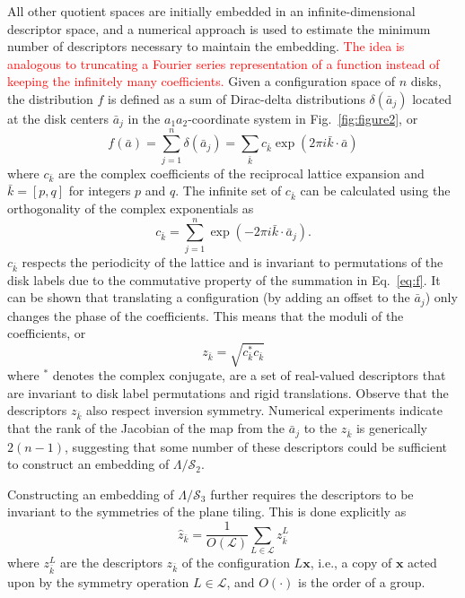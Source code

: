 \documentclass[default,iicol]{sn-jnl}%
\theoremstyle{thmstyleone}%
\theoremstyle{thmstyletwo}%
\theoremstyle{thmstylethree}%
\renewcommand{\vec}[1]{\bar{#1}}
\providecommand{\config}[1]{\mathbf{#1}}
\providecommand{\rmi}{i}
\providecommand{\red}[1]{\textcolor{red}{#1}}
\begin{document}
All other quotient spaces are initially embedded in an infinite-dimensional descriptor space, and a numerical approach is used to estimate the minimum number of descriptors necessary to maintain the embedding. \red{The idea is analogous to truncating a Fourier series representation of a function instead of keeping the infinitely many coefficients.} Given a configuration space of $n$ disks, the distribution $f$ is defined as a sum of Dirac-delta distributions $\delta(\vec{a}_j)$ located at the disk centers $\vec{a}_j$ in the $a_1a_2$-coordinate system in Fig.\ \ref{fig:figure2}, or
\begin{equation}
f(\vec{a}) = \sum_{j = 1}^{n} \delta(\vec{a}_j) = \sum_{\vec{k}} {c_{\vec{k}} \exp{(2\pi \rmi \vec{k} \cdot \vec{a})}}
\label{eq:f}
\end{equation}
where $c_{\vec{k}}$ are the complex coefficients of the reciprocal lattice expansion and $\vec{k} = [p, q]$ for integers $p$ and $q$. The infinite set of $c_{\vec{k}}$ can be calculated using the orthogonality of the complex exponentials as
\begin{equation}
c_{\vec{k}} = \sum_{j=1}^{n} \exp{(-2\pi \rmi \vec{k} \cdot \vec{a}_j)} .
\label{eq:c_k}
\end{equation}
$c_{\vec{k}}$ respects the periodicity of the lattice and is invariant to permutations of the disk labels due to the commutative property of the summation in Eq.\ \ref{eq:f}. It can be shown that translating a configuration (by adding an offset to the $\vec{a}_j$) only changes the phase of the coefficients. This means that the moduli of the coefficients, or
\begin{equation}
z_{\vec{k}} = \sqrt{c^\ast_{\vec{k}} c_{\vec{k}}}
\label{eq:z_k}
\end{equation}
where $^\ast$ denotes the complex conjugate, are a set of real-valued descriptors that are invariant to disk label permutations and rigid translations. Observe that the descriptors $z_{\vec{k}}$ also respect inversion symmetry. Numerical experiments indicate that the rank of the Jacobian of the map from the $\vec{a}_j$ to the $z_{\vec{k}}$ is generically $2(n - 1)$, suggesting that some number of these descriptors could be sufficient to construct an embedding of $\Lambda / \mathcal{S}_2$.

Constructing an embedding of $\Lambda / \mathcal{S}_3$ further requires the descriptors to be invariant to the symmetries of the plane tiling. This is done explicitly as
\begin{equation}
\hat{z}_{\vec{k}} = \frac{1}{O(\mathcal{L})}\sum_{L \in \mathcal{L}} z_{\vec{k}}^{L}
\label{eq:z_hat_k}
\end{equation}
where $z_{\vec{k}}^{L}$ are the descriptors $z_{\vec{k}}$ of the configuration $L \config{x}$, i.e., a copy of $\config{x}$ acted upon by the symmetry operation $L \in \mathcal{L}$, and $O(\cdot)$ is the order of a group.
\end{document}
